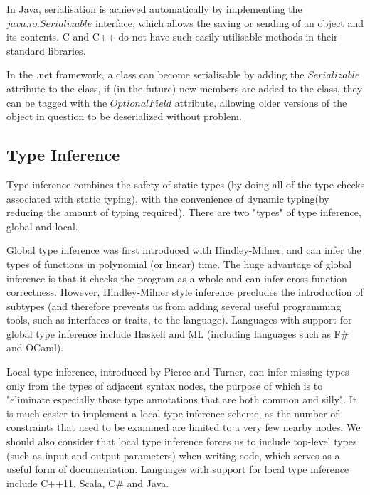 \documentclass[pdftex,11pt,a4paper]{report}
\begin{document}
In Java, serialisation is achieved automatically by implementing the $java.io.Serializable$ \cite{java-serializable} interface, which allows the saving or sending of an object and its contents.
C and C++ do not have such easily utilisable methods in their standard libraries.

In the .net framework, a class can become serialisable by adding the $Serializable$\cite{net-serializable} attribute to the class, if (in the future) new members are added to the class, they can be tagged with the $OptionalField$ attribute\cite{net-optional}, allowing older versions of the object in question to be deserialized without problem.

\subsection{Type Inference}

Type inference\cite{damas-milner} combines the safety of static types\cite{palsberg199419} (by doing all of the type checks associated with static typing), with the convenience of dynamic typing\cite{Abadi:1991:DTS:103135.103138}(by reducing the amount of typing required).
There are two "types" of type inference, global and local.

Global type inference was first introduced with Hindley-Milner\cite{hindley-milner}, and can infer the types of functions in polynomial (or linear) time.
The huge advantage of global inference is that it checks the program as a whole and can infer cross-function correctness.
However, Hindley-Milner style inference precludes the introduction of subtypes\cite{Mitchell:1984:CTI:800017.800529} (and therefore prevents us from adding several useful programming tools, such as interfaces or traits, to the language).
Languages with support for global type inference include Haskell and ML (including languages such as F\# and OCaml).

Local type inference, introduced by Pierce and Turner\cite{pierce1997local}, can infer missing types only from the types of adjacent syntax nodes\cite{hosoya1999good}, the purpose of which is to "eliminate especially those type annotations that are both common and silly"\cite{pierce2000local}.
It is much easier to implement a local type inference scheme, as the number of constraints that need to be examined are limited to a very few nearby nodes.
We should also consider that local type inference forces us to include top-level types (such as input and output parameters) when writing code, which serves as a useful form of documentation\cite{pierce2000local}.
Languages with support for local type inference include C++11, Scala, C\# and Java.
\end{document}
